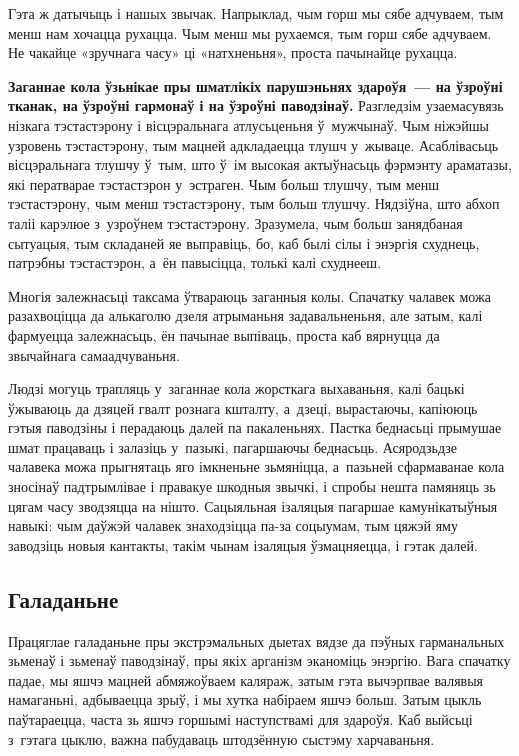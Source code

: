 Гэта ж датычыць і нашых звычак. Напрыклад, чым горш мы сябе адчуваем, тым менш нам хочацца рухацца. Чым менш мы рухаемся, тым горш сябе адчуваем. Не чакайце «зручнага часу» ці «натхненьня», проста пачынайце рухацца.

\textbf{Заганнае кола ўзьнікае пры шматлікіх парушэньнях здароўя~--- на ўзроўні тканак, на ўзроўні гармонаў і на ўзроўні паводзінаў.} Разгледзім узаемасувязь нізкага тэстастэрону і вісцэральнага атлусьценьня ў~мужчынаў. Чым ніжэйшы узровень тэстастэрону, тым мацней адкладаецца тлушч у~жываце. Асаблівасьць вісцэральнага тлушчу ў~тым, што ў~ім высокая актыўнасьць фэрмэнту араматазы, які ператварае тэстастэрон у~эстраген. Чым больш тлушчу, тым менш тэстастэрону, чым менш тэстастэрону, тым больш тлушчу. Нядзіўна, што абхоп таліі карэлюе з~узроўнем тэстастэрону. Зразумела, чым больш занядбаная сытуацыя, тым складаней яе выправіць, бо, каб былі сілы і энэргія схуднець, патрэбны тэстастэрон, а~ён павысіцца, толькі калі схуднееш.

Многія залежнасьці таксама ўтвараюць заганныя колы. Спачатку чалавек можа разахвоціцца да алькаголю дзеля атрыманьня задавальненьня, але затым, калі фармуецца залежнасьць, ён пачынае выпіваць, проста каб вярнуцца да звычайнага самаадчуваньня. 


Людзі могуць трапляць у~заганнае кола жорсткага выхаваньня, калі бацькі ўжываюць да дзяцей гвалт рознага кшталту, а~дзеці, вырастаючы, капіююць гэтыя паводзіны і перадаюць далей па пакаленьнях. Пастка беднасьці прымушае шмат працаваць і залазіць у~пазыкі, пагаршаючы беднасьць. Асяродзьдзе чалавека можа прыгнятаць яго імкненьне зьмяніцца, а~пазьней сфармаванае кола зносінаў падтрымлівае і правакуе шкодныя звычкі, і спробы нешта памяняць зь цягам часу зводзяцца на нішто. Сацыяльная ізаляцыя пагаршае камунікатыўныя навыкі: чым даўжэй чалавек знаходзіцца па-за соцыумам, тым цяжэй яму заводзіць новыя кантакты, такім чынам ізаляцыя ўзмацняецца, і гэтак далей.

\subsection*{Галаданьне}

Працяглае галаданьне пры экстрэмальных дыетах вядзе да пэўных гарманальных зьменаў і зьменаў паводзінаў, пры якіх арганізм эканоміць энэргію. Вага спачатку падае, мы яшчэ мацней абмяжоўваем каляраж, затым гэта вычэрпвае валявыя намаганьні, адбываецца зрыў, і мы хутка набіраем яшчэ больш. Затым цыкль паўтараецца, часта зь яшчэ горшымі наступствамі для здароўя. Каб выйсьці з~гэтага цыклю, важна пабудаваць штодзённую сыстэму харчаваньня.

